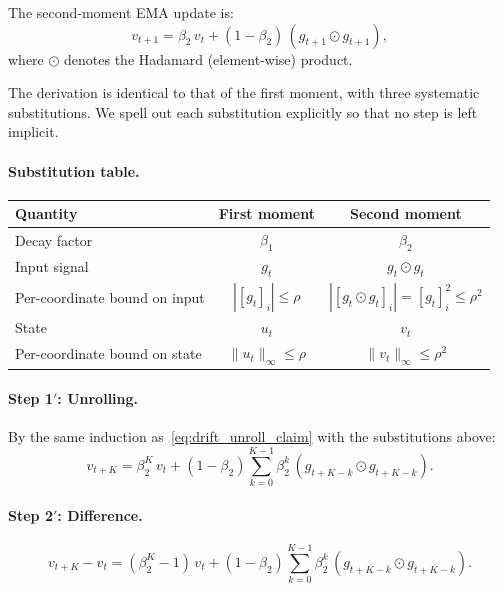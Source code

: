 \documentclass{article}
\begin{document}
The second-moment EMA update is:
\begin{equation}
v_{t+1} = \beta_2\,v_t + (1-\beta_2)\,(g_{t+1} \odot g_{t+1}),
\label{eq:drift_v_ema}
\end{equation}
where $\odot$ denotes the Hadamard (element-wise) product.

The derivation is identical to that of the first moment, with three
systematic substitutions. We spell out each substitution explicitly so
that no step is left implicit.

\paragraph{Substitution table.}
\begin{center}
\begin{tabular}{lcc}
\toprule
\textbf{Quantity} & \textbf{First moment} & \textbf{Second moment} \\
\midrule
Decay factor & $\beta_1$ & $\beta_2$ \\
Input signal & $g_t$ & $g_t \odot g_t$ \\
Per-coordinate bound on input & $|[g_t]_i| \leq \rho$ & $|[g_t \odot g_t]_i| = [g_t]_i^2 \leq \rho^2$ \\
State & $u_t$ & $v_t$ \\
Per-coordinate bound on state & $\|u_t\|_\infty \leq \rho$ & $\|v_t\|_\infty \leq \rho^2$ \\
\bottomrule
\end{tabular}
\end{center}

\paragraph{Step 1$'$: Unrolling.}
By the same induction as~\eqref{eq:drift_unroll_claim} with the
substitutions above:
\begin{equation}
v_{t+K} = \beta_2^K\,v_t
+ (1-\beta_2)\sum_{k=0}^{K-1}\beta_2^k\,(g_{t+K-k} \odot g_{t+K-k}).
\label{eq:drift_v_unroll}
\end{equation}

\paragraph{Step 2$'$: Difference.}
\begin{equation}
v_{t+K} - v_t
= (\beta_2^K - 1)\,v_t
+ (1-\beta_2)\sum_{k=0}^{K-1}\beta_2^k\,(g_{t+K-k} \odot g_{t+K-k}).
\label{eq:drift_v_diff}
\end{equation}
\end{document}
